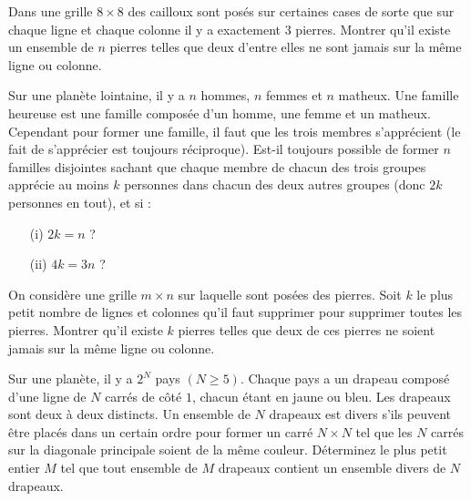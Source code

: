 \begin{exo}
Dans une grille $8\times 8$ des cailloux sont posés sur certaines cases de sorte que sur chaque ligne et chaque colonne il y a exactement $3$ pierres. Montrer qu'il existe un ensemble de $n$ pierres telles que deux d'entre elles ne sont jamais sur la même ligne ou colonne.
\end{exo}


\begin{exo}
Sur une planète lointaine, il y a $n$ hommes, $n$ femmes et $n$ matheux. Une famille heureuse est une famille composée d'un homme, une femme et un matheux. Cependant pour former une famille, il faut que les trois membres s'apprécient (le fait de s'apprécier est toujours réciproque). Est-il toujours possible de former $n$ familles disjointes sachant que chaque membre de chacun des trois groupes apprécie au moins $k$ personnes dans chacun des deux autres groupes (donc $2k$ personnes en tout), et si :

\begin{itemize}
\item[(i)] $2k = n$ ?
\item[(ii)] $4k = 3n$ ?
\end{itemize}
\end{exo}


\begin{exo}
On considère une grille $m \times n$ sur laquelle sont posées des pierres. Soit $k$ le plus petit nombre de lignes et colonnes qu'il faut supprimer pour supprimer toutes les pierres. Montrer qu'il existe $k$ pierres telles que deux de ces pierres ne soient jamais sur la même ligne ou colonne.
\end{exo}


\begin{exo}%
Sur une planète, il y a $2^N$ pays $(N \ge 5)$. Chaque pays a un drapeau composé d'une ligne de $N$ carrés de côté $1$, chacun étant en jaune ou bleu. Les drapeaux sont deux à deux distincts. Un ensemble de $N$ drapeaux est divers s'ils peuvent être placés dans un certain ordre pour former un carré $N \times N$ tel que les $N$ carrés sur la diagonale principale soient de la même couleur. Déterminez le plus petit entier $M$ tel que tout ensemble de $M$ drapeaux contient un ensemble divers de $N$ drapeaux.
\end{exo}




